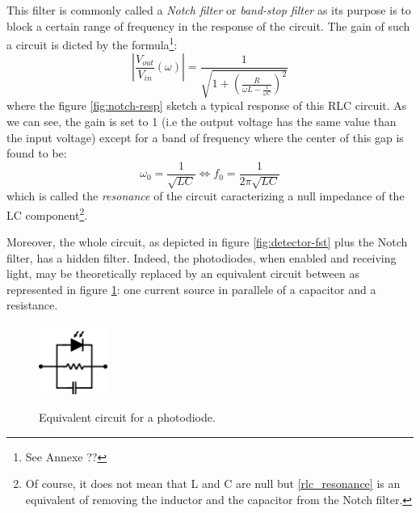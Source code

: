 \documentclass[12pt]{report}
\begin{document}
This filter is commonly called a \textit{Notch filter} or \textit{band-stop filter} as its purpose is to block a certain range of frequency in the response of the circuit. The gain of such a circuit is dicted by the formula\footnote{See Annexe ??}:
\begin{equation}
\left\lvert \frac{V_{out}}{V_{in}} (\omega) \right\rvert = \frac{1}{\sqrt{1 + \left(\frac{R}{\omega L - \frac{1}{\omega C}}\right)^2}}
\end{equation}
where the figure \ref{fig:notch-resp} sketch a typical response of this RLC circuit. As we can see, the gain is set to 1 (i.e the output voltage has the same value than the input voltage) except for a band of frequency where the center of this gap is found to be:
\begin{equation}
\label{rlc_resonance}
\omega_0 = \frac{1}{\sqrt{LC}} \Leftrightarrow f_0 = \frac{1}{2\pi\sqrt{LC}}
\end{equation}
which is called the \textit{resonance} of the circuit caracterizing a null impedance of the LC component\footnote{Of course, it does not mean that L and C are null but \eqref{rlc_resonance} is an equivalent of removing the inductor and the capacitor from the Notch filter.}.

Moreover, the whole circuit, as depicted in figure \ref{fig:detector-fst} plus the Notch filter, has a hidden filter. Indeed, the photodiodes, when enabled and receiving light, may be theoretically replaced by an equivalent circuit between as represented in figure \ref{fig:equiv-diode}: one current source in parallele of a capacitor and a resistance.

\begin{figure}[h!]
\caption{Equivalent circuit for a photodiode.}
\centering
\includegraphics[width=0.2\textwidth]{equiv-diode}
\label{fig:equiv-diode}
\end{figure}
\end{document}
